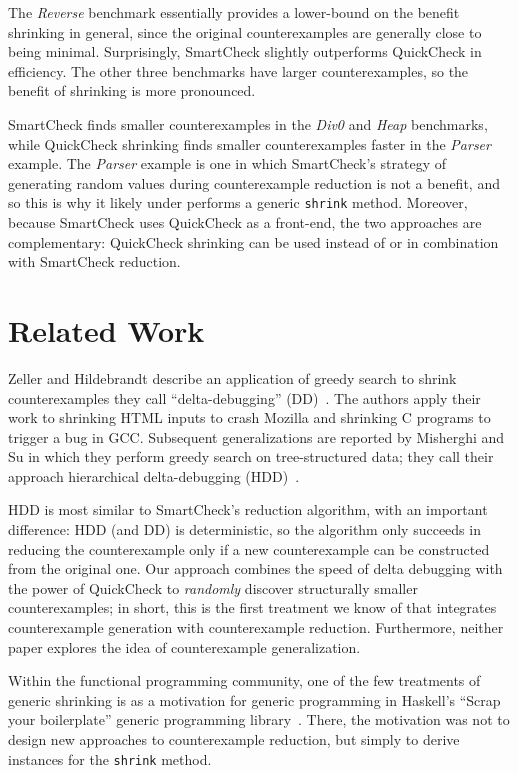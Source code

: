\documentclass{sigplanconf}
\newcommand{\ttp}[1]{\texttt{#1}}
\begin{document}
The \emph{Reverse} benchmark essentially provides a lower-bound on the benefit
shrinking in general, since the original counterexamples are generally close to
being minimal.  Surprisingly, SmartCheck slightly outperforms QuickCheck in
efficiency.  The other three benchmarks have larger counterexamples, so the
benefit of shrinking is more pronounced.

SmartCheck finds smaller counterexamples in the \emph{Div0} and \emph{Heap}
benchmarks, while QuickCheck shrinking finds smaller counterexamples faster in
the \emph{Parser} example.  The \emph{Parser} example is one in which
SmartCheck's strategy of generating random values during counterexample
reduction is not a benefit, and so this is why it likely under performs a
generic \ttp{shrink} method.  Moreover, because SmartCheck uses QuickCheck as a
front-end, the two approaches are complementary: QuickCheck shrinking can be
used instead of or in combination with SmartCheck reduction.

\section{Related Work}\label{sec:related}

Zeller and Hildebrandt describe an application of greedy search to shrink
counterexamples they call ``delta-debugging'' (DD)~\cite{dd}.  The authors apply
their work to shrinking HTML inputs to crash Mozilla and shrinking C programs to
trigger a bug in GCC.  Subsequent generalizations are reported by Misherghi and
Su in which they perform greedy search on tree-structured data; they call their
approach hierarchical delta-debugging (HDD)~\cite{hdd}.

HDD is most similar to SmartCheck's reduction algorithm, with an important
difference: HDD (and DD) is deterministic, so the algorithm only succeeds in
reducing the counterexample only if a new counterexample can be constructed from
the original one.  Our approach combines the speed of delta debugging with the
power of QuickCheck to \emph{randomly} discover structurally smaller
counterexamples; in short, this is the first treatment we know of that
integrates counterexample generation with counterexample reduction.
Furthermore, neither paper explores the idea of counterexample generalization.

Within the functional programming community, one of the few treatments of
generic shrinking is as a motivation for generic programming in Haskell's
``Scrap your boilerplate'' generic programming library~\cite{syb}.  There, the
motivation was not to design new approaches to counterexample reduction, but
simply to derive instances for the \ttp{shrink} method.
\end{document}
